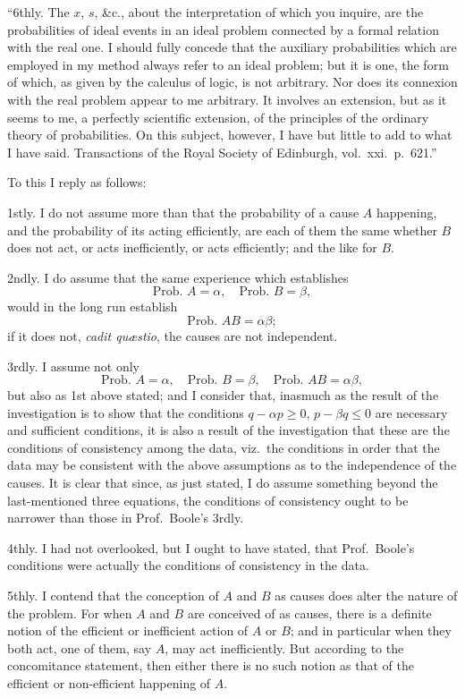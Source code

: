 \documentclass[11pt,a4paper]{article}
\theoremstyle{plain}
\begin{document}
``6thly. The $x$, $s$, \&c., about the interpretation of which you inquire, are the probabilities of ideal events in an ideal problem connected by a formal relation with the real one. I should fully concede that the auxiliary probabilities which are employed in my method always refer to an ideal problem; but it is one, the form of which, as given by the calculus of logic, is not arbitrary. Nor does its connexion with the real problem appear to me arbitrary. It involves an extension, but as it seems to me, a perfectly scientific extension, of the principles of the ordinary theory of probabilities. On this subject, however, I have but little to add to what I have said. Transactions of the Royal Society of Edinburgh, vol.\ xxi.\ p.\ 621.''

\newpage
To this I reply as follows:

1stly. I do not assume more than that the probability of a cause $A$ happening, and the probability of its acting efficiently, are each of them the same whether $B$ does not act, or acts inefficiently, or acts efficiently; and the like for $B$.

2ndly. I do assume that the same experience which establishes
\[
\text{Prob.\ } A = \alpha, \quad \text{Prob.\ } B = \beta,
\]
would in the long run establish
\[
\text{Prob.\ } AB = \alpha\beta;
\]
if it does not, \textit{cadit qu\ae stio}, the causes are not independent.

3rdly. I assume not only
\[
\text{Prob.\ } A = \alpha, \quad \text{Prob.\ } B = \beta, \quad \text{Prob.\ } AB = \alpha\beta,
\]
but also as 1st above stated; and I consider that, inasmuch as the result of the investigation is to show that the conditions $q - \alpha p \geq 0$, $p - \beta q \leq 0$ are necessary and sufficient conditions, it is also a result of the investigation that these are the conditions of consistency among the data, viz.\ the conditions in order that the data may be consistent with the above assumptions as to the independence of the causes. It is clear that since, as just stated, I do assume something beyond the last-mentioned three equations, the conditions of consistency ought to be narrower than those in Prof.\ Boole's 3rdly.

4thly. I had not overlooked, but I ought to have stated, that Prof.\ Boole's conditions were actually the conditions of consistency in the data.

5thly. I contend that the conception of $A$ and $B$ as causes does alter the nature of the problem. For when $A$ and $B$ are conceived of as causes, there is a definite notion of the efficient or inefficient action of $A$ or $B$; and in particular when they both act, one of them, say $A$, may act inefficiently. But according to the concomitance statement, then either there is no such notion as that of the efficient or non-efficient happening of $A$.
\end{document}

